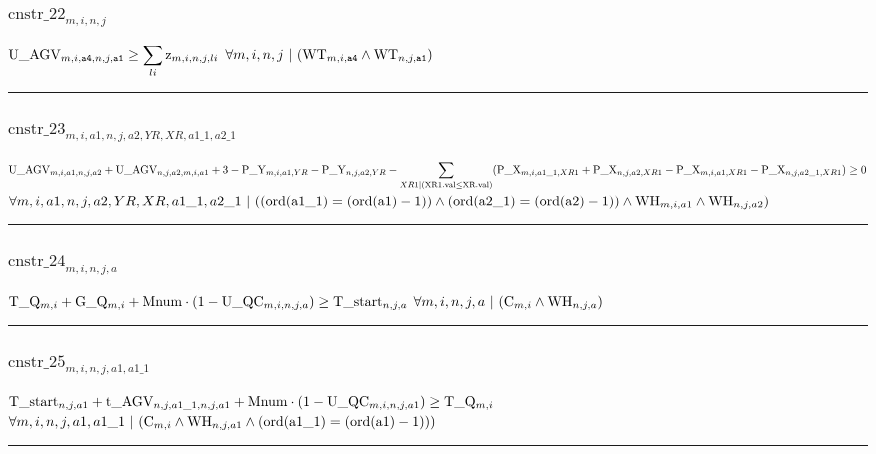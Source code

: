 \documentclass[11pt]{article}
\begin{document}
\subsubsection*{$\text{cnstr\_22}_{m, i, n, j}$} \label{cnstr_22}
$
\textcolor{black}{\text{U\_AGV}}_{m, i, \texttt{a4}, n, j, \texttt{a1}} \geq \displaystyle \sum_{li}\textcolor{black}{\text{z}}_{m, i, n, j, li}
$
\hfill
$
\forall{ m, i, n, j}  ~ | ~ ( \textcolor{black}{\text{WT}}_{m, i, \texttt{a4}} \wedge \textcolor{black}{\text{WT}}_{n, j, \texttt{a1}} )
$ \vspace{5pt}
\hrule 
\subsubsection*{$\text{cnstr\_23}_{m, i, a1, n, j, a2, YR, XR, a1\_1, a2\_1}$} \label{cnstr_23}
$
\textcolor{black}{\text{U\_AGV}}_{m, i, a1, n, j, a2} + \textcolor{black}{\text{U\_AGV}}_{n, j, a2, m, i, a1} + 3 - \textcolor{black}{\text{P\_Y}}_{m, i, a1, YR} - \textcolor{black}{\text{P\_Y}}_{n, j, a2, YR} - \displaystyle \sum_{XR1 |  ( \textcolor{black}{\text{XR1.val}}  \leq  \textcolor{black}{\text{XR.val}} ) } ( \textcolor{black}{\text{P\_X}}_{m, i, a1\_1, XR1} + \textcolor{black}{\text{P\_X}}_{n, j, a2, XR1} - \textcolor{black}{\text{P\_X}}_{m, i, a1, XR1} - \textcolor{black}{\text{P\_X}}_{n, j, a2\_1, XR1} )  \geq 0
$
\hfill
$
\forall{ m, i, a1, n, j, a2, YR, XR, a1\_1, a2\_1}  ~ | ~ (  (  \text{ord}( \textcolor{black}{\text{a1\_1}} )   =   (  \text{ord}( \textcolor{black}{\text{a1}} )  - 1 )  )  \wedge  (  \text{ord}( \textcolor{black}{\text{a2\_1}} )   =   (  \text{ord}( \textcolor{black}{\text{a2}} )  - 1 )  )  \wedge \textcolor{black}{\text{WH}}_{m, i, a1} \wedge \textcolor{black}{\text{WH}}_{n, j, a2} )
$ \vspace{5pt}
\hrule 
\subsubsection*{$\text{cnstr\_24}_{m, i, n, j, a}$} \label{cnstr_24}
$
\textcolor{black}{\text{T\_Q}}_{m, i} + \textcolor{black}{\text{G\_Q}}_{m, i} + \textcolor{black}{\text{Mnum}} \cdot  ( 1 - \textcolor{black}{\text{U\_QC}}_{m, i, n, j, a} )  \geq \textcolor{black}{\text{T\_start}}_{n, j, a}
$
\hfill
$
\forall{ m, i, n, j, a}  ~ | ~ ( \textcolor{black}{\text{C}}_{m, i} \wedge \textcolor{black}{\text{WH}}_{n, j, a} )
$ \vspace{5pt}
\hrule 
\subsubsection*{$\text{cnstr\_25}_{m, i, n, j, a1, a1\_1}$} \label{cnstr_25}
$
\textcolor{black}{\text{T\_start}}_{n, j, a1} + \textcolor{black}{\text{t\_AGV}}_{n, j, a1\_1, n, j, a1} + \textcolor{black}{\text{Mnum}} \cdot  ( 1 - \textcolor{black}{\text{U\_QC}}_{m, i, n, j, a1} )  \geq \textcolor{black}{\text{T\_Q}}_{m, i}
$
\hfill
$
\forall{ m, i, n, j, a1, a1\_1}  ~ | ~ ( \textcolor{black}{\text{C}}_{m, i} \wedge \textcolor{black}{\text{WH}}_{n, j, a1} \wedge  (  \text{ord}( \textcolor{black}{\text{a1\_1}} )   =   (  \text{ord}( \textcolor{black}{\text{a1}} )  - 1 )  )  )
$ \vspace{5pt}
\hrule 
\end{document}
